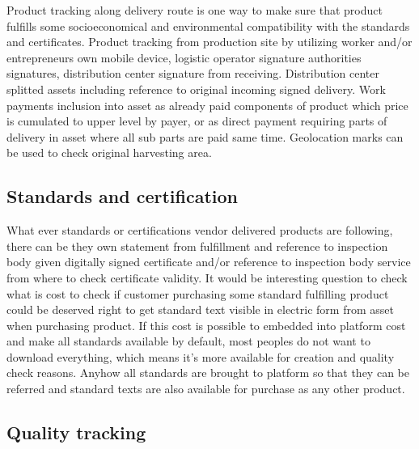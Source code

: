 Product tracking along delivery route is one way to make sure that product fulfills some socioeconomical and environmental compatibility with the standards and certificates. Product tracking from production site by utilizing worker and/or en\-tre\-pre\-neurs own mobile device,  logistic operator signature authorities signatures, distribution center signature from receiving. Distribution center splitted assets including reference to original incoming signed delivery. Work payments inclusion into asset as already paid components of product which price is cumulated to upper level by payer, or as direct payment requiring parts of delivery in asset where all sub parts are paid same time. Geolocation marks can be used to check original harvesting area.

\subsection{Standards and certification}
\label{standards_and_certification}

What ever standards or certifications vendor delivered products are following, there can be they own statement from fulfillment and reference to inspection body given digitally signed certificate and/or reference to inspection body service from where to check certificate validity. It would be interesting question to check what is cost to check if customer purchasing some standard fulfilling product could be deserved right to get standard text visible in electric form from asset when purchasing product. If this cost is possible to embedded into platform cost and make all standards available by default, most peoples do not want to download everything, which means it's more available for creation and quality check reasons. Anyhow all standards are brought to platform so that they can be referred and standard texts are also available for purchase as any other product.

\subsection{Quality tracking}
\label{quality_tracking}

